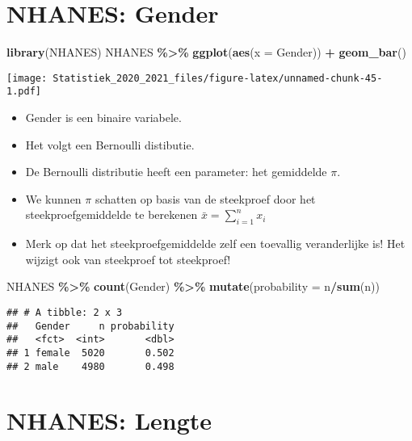 \documentclass[
  12pt,dutch,coursenotes]{book}
\newenvironment{Shaded}{\begin{snugshade}}{\end{snugshade}}
\newcommand{\DataTypeTok}[1]{\textcolor[rgb]{0.13,0.29,0.53}{#1}}
\newcommand{\KeywordTok}[1]{\textcolor[rgb]{0.13,0.29,0.53}{\textbf{#1}}}
\newcommand{\NormalTok}[1]{#1}
\newcommand{\OperatorTok}[1]{\textcolor[rgb]{0.81,0.36,0.00}{\textbf{#1}}}
\newcommand{\StringTok}[1]{\textcolor[rgb]{0.31,0.60,0.02}{#1}}
\providecommand{\tightlist}{%
  \setlength{\itemsep}{0pt}\setlength{\parskip}{0pt}}
\theoremstyle{definition}
\theoremstyle{definition}
\theoremstyle{definition}
\theoremstyle{remark}
\begin{document}
\hypertarget{nhanes-gender}{%
\section{NHANES: Gender}\label{nhanes-gender}}

\begin{Shaded}
\begin{Highlighting}[]
\KeywordTok{library}\NormalTok{(NHANES)}
\NormalTok{NHANES }\OperatorTok{\%\textgreater{}\%}\StringTok{ }\KeywordTok{ggplot}\NormalTok{(}\KeywordTok{aes}\NormalTok{(}\DataTypeTok{x =}\NormalTok{ Gender)) }\OperatorTok{+}\StringTok{ }\KeywordTok{geom\_bar}\NormalTok{()}
\end{Highlighting}
\end{Shaded}

\texttt{[image: Statistiek\_2020\_2021\_files/figure-latex/unnamed-chunk-45-1.pdf]}

\begin{itemize}
\tightlist
\item
  Gender is een binaire variabele.
\item
  Het volgt een Bernoulli distibutie.
\item
  De Bernoulli distributie heeft een parameter: het gemiddelde \(\pi\).
\item
  We kunnen \(\pi\) schatten op basis van de steekproef door het steekproefgemiddelde te berekenen \(\bar x = \sum\limits_{i=1}^n x_i\)
\item
  Merk op dat het steekproefgemiddelde zelf een toevallig veranderlijke is! Het wijzigt ook van steekproef tot steekproef!
\end{itemize}

\begin{Shaded}
\begin{Highlighting}[]
\NormalTok{NHANES }\OperatorTok{\%\textgreater{}\%}\StringTok{ }\KeywordTok{count}\NormalTok{(Gender) }\OperatorTok{\%\textgreater{}\%}\StringTok{ }\KeywordTok{mutate}\NormalTok{(}\DataTypeTok{probability =}\NormalTok{ n}\OperatorTok{/}\KeywordTok{sum}\NormalTok{(n))}
\end{Highlighting}
\end{Shaded}

\begin{verbatim}
## # A tibble: 2 x 3
##   Gender     n probability
##   <fct>  <int>       <dbl>
## 1 female  5020       0.502
## 2 male    4980       0.498
\end{verbatim}

\hypertarget{nhanes-lengte}{%
\section{NHANES: Lengte}\label{nhanes-lengte}}
\end{document}
